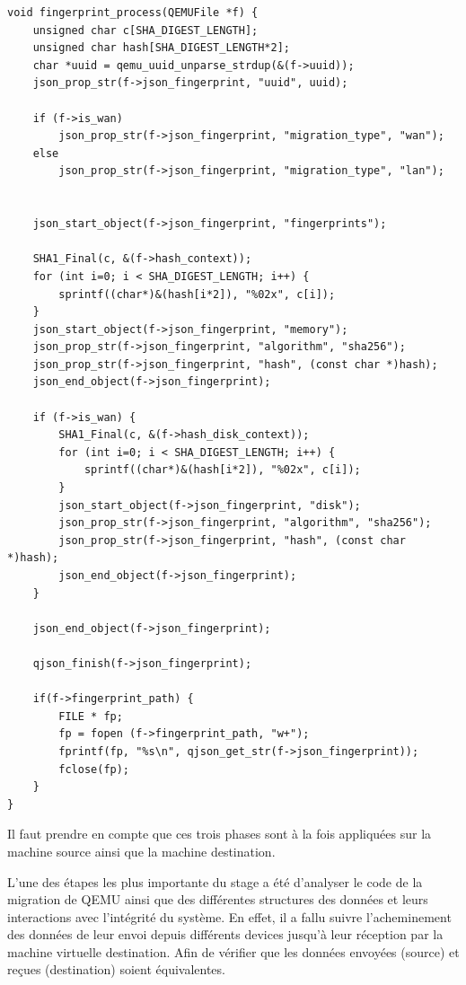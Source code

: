 \begin{lstlisting}[caption={Action lors de la fin de la migration},captionpos=b]  
void fingerprint_process(QEMUFile *f) {
    unsigned char c[SHA_DIGEST_LENGTH];
    unsigned char hash[SHA_DIGEST_LENGTH*2];
    char *uuid = qemu_uuid_unparse_strdup(&(f->uuid));
    json_prop_str(f->json_fingerprint, "uuid", uuid);
    
    if (f->is_wan)
        json_prop_str(f->json_fingerprint, "migration_type", "wan");
    else
        json_prop_str(f->json_fingerprint, "migration_type", "lan");


    json_start_object(f->json_fingerprint, "fingerprints");
    
    SHA1_Final(c, &(f->hash_context));
    for (int i=0; i < SHA_DIGEST_LENGTH; i++) {
        sprintf((char*)&(hash[i*2]), "%02x", c[i]);
    }
    json_start_object(f->json_fingerprint, "memory");
    json_prop_str(f->json_fingerprint, "algorithm", "sha256");
    json_prop_str(f->json_fingerprint, "hash", (const char *)hash);
    json_end_object(f->json_fingerprint);

    if (f->is_wan) {
        SHA1_Final(c, &(f->hash_disk_context));
        for (int i=0; i < SHA_DIGEST_LENGTH; i++) {
            sprintf((char*)&(hash[i*2]), "%02x", c[i]);
        }
        json_start_object(f->json_fingerprint, "disk");
        json_prop_str(f->json_fingerprint, "algorithm", "sha256");
        json_prop_str(f->json_fingerprint, "hash", (const char *)hash);
        json_end_object(f->json_fingerprint);
    }

    json_end_object(f->json_fingerprint);

    qjson_finish(f->json_fingerprint);
    
    if(f->fingerprint_path) {
        FILE * fp;
        fp = fopen (f->fingerprint_path, "w+");
        fprintf(fp, "%s\n", qjson_get_str(f->json_fingerprint));        
        fclose(fp);
    }
}
\end{lstlisting}

Il faut prendre en compte que ces trois phases sont à la fois appliquées sur la machine source ainsi que la machine destination.


L'une des étapes les plus importante du stage a été d'analyser le code de la migration de QEMU ainsi que des différentes structures des données et leurs interactions avec l'intégrité du système.
En effet, il a fallu suivre l'acheminement des données de leur envoi depuis différents devices jusqu'à leur réception par la machine virtuelle destination.
Afin de vérifier que les données envoyées (source) et reçues (destination) soient équivalentes.


